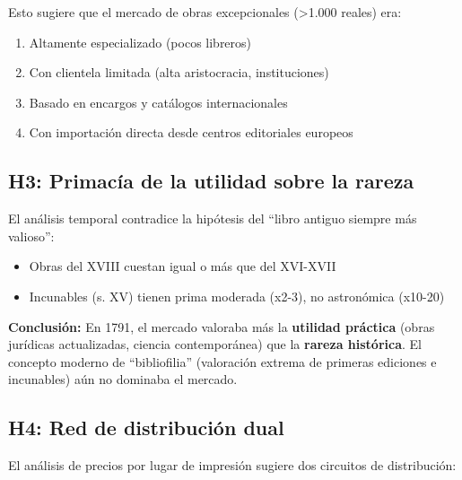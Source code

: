 \documentclass[12pt,a4paper]{article}
\begin{document}
Esto sugiere que el mercado de obras excepcionales (>1.000 reales) era:
\begin{enumerate}
    \item Altamente especializado (pocos libreros)
    \item Con clientela limitada (alta aristocracia, instituciones)
    \item Basado en encargos y catálogos internacionales
    \item Con importación directa desde centros editoriales europeos
\end{enumerate}

\subsection{H3: Primacía de la utilidad sobre la rareza}

El análisis temporal contradice la hipótesis del ``libro antiguo siempre más valioso'':

\begin{itemize}
    \item Obras del XVIII cuestan igual o más que del XVI-XVII
    \item Incunables (s. XV) tienen prima moderada (x2-3), no astronómica (x10-20)
\end{itemize}

\textbf{Conclusión:} En 1791, el mercado valoraba más la \textbf{utilidad práctica} (obras jurídicas actualizadas, ciencia contemporánea) que la \textbf{rareza histórica}. El concepto moderno de ``bibliofilia'' (valoración extrema de primeras ediciones e incunables) aún no dominaba el mercado.

\subsection{H4: Red de distribución dual}

El análisis de precios por lugar de impresión sugiere dos circuitos de distribución:
\end{document}

